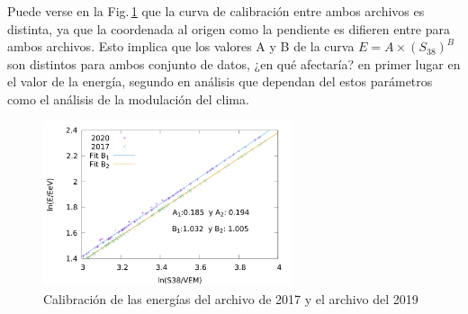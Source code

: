       Puede verse en la Fig.\,\ref{fig:calibracionE} que la curva de calibración entre ambos archivos es distinta, ya que la coordenada al origen como la pendiente es difieren entre para ambos archivos. Esto implica que los valores A y B de la curva $E=A\times (S_{38})^B$ son distintos para ambos conjunto de datos, ¿en qué afectaría? en primer lugar en el valor de la energía, segundo en análisis que dependan del estos parámetros como el análisis de la modulación del clima.

        \begin{figure}[H]
          \centering
          \includegraphics[width=0.65\textwidth]{../0_Introduccion/comparacion_reconstruccion.png}
          \caption{Calibración de las energías del archivo de 2017 y el archivo del 2019}
          \label{fig:calibracionE}
        \end{figure}





